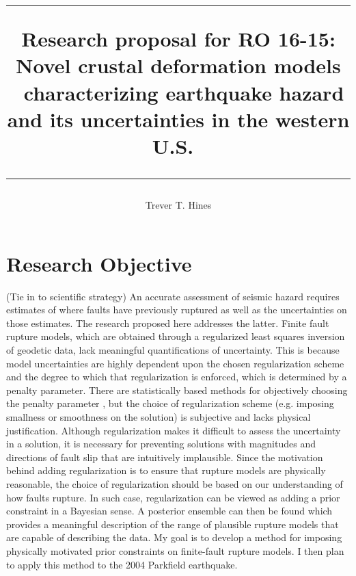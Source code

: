 \documentclass[12pt]{article}
\title{	
 \rule{\headwidth}{1.0pt}
 Research proposal for RO 16-15:
 Novel crustal deformation models \
 characterizing earthquake hazard and its uncertainties in the western U.S.\
 \rule{\headwidth}{1.0pt}
 \author{Trever T. Hines}}
\begin{document}
\maketitle

\section*{Research Objective}

(Tie in to scientific strategy) An accurate assessment of seismic hazard requires estimates of where faults have previously ruptured as well as the uncertainties on those estimates.  The research proposed here addresses the latter. Finite fault rupture models, which are obtained through a regularized least squares inversion of geodetic data, lack meaningful quantifications of uncertainty. This is because model uncertainties are highly dependent upon the chosen regularization scheme and the degree to which that regularization is enforced, which is determined by a penalty parameter. There are statistically based methods for objectively choosing the penalty parameter \citep[e.g.][]{Yabuki1992,Fukuda2008}, but the choice of regularization scheme (e.g. imposing smallness or smoothness on the solution) is subjective and lacks physical justification.  Although regularization makes it difficult to assess the uncertainty in a solution, it is necessary for preventing solutions with magnitudes and directions of fault slip that are intuitively implausible. Since the motivation behind adding regularization is to ensure that rupture models are physically reasonable, the choice of regularization should be based on our understanding of how faults rupture.  In such case, regularization can be viewed as adding a prior constraint in a Bayesian sense. A posterior ensemble can then be found which provides a meaningful description of the range of plausible rupture models that are capable of describing the data.  My goal is to develop a method for imposing physically motivated prior constraints on finite-fault rupture models. I then plan to apply this method to the 2004 Parkfield earthquake.  
\end{document}
